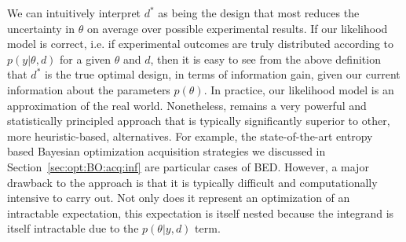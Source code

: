 We can intuitively interpret $d^*$ as being the design that most reduces the uncertainty in $\theta$
on average over possible experimental results.  If our likelihood model is correct, i.e. if experimental outcomes
are truly distributed according to $p(y | \theta, d)$ for a given $\theta$ and $d$, then it is easy to see 		
from the above definition that		
$d^*$ is the true optimal design, in terms of information gain, given our current information about		
the parameters $p\left(\theta \right)$.  		
In practice, our likelihood model is an approximation of		
the real world.
Nonetheless, \Bad remains a very powerful and
statistically principled approach that is typically significantly superior to other, more heuristic-based,
alternatives.  For example, the state-of-the-art entropy based Bayesian optimization acquisition strategies we 
discussed in Section~\ref{sec:opt:BO:acq:inf} are particular cases of BED.
However, a major drawback to the \Bad
approach is that it is typically difficult and computationally intensive to carry out.  
Not only does it represent an optimization 
of an intractable expectation, this expectation is itself nested because
the integrand is itself intractable due to the $p\left(\theta | y, d\right)$ term.